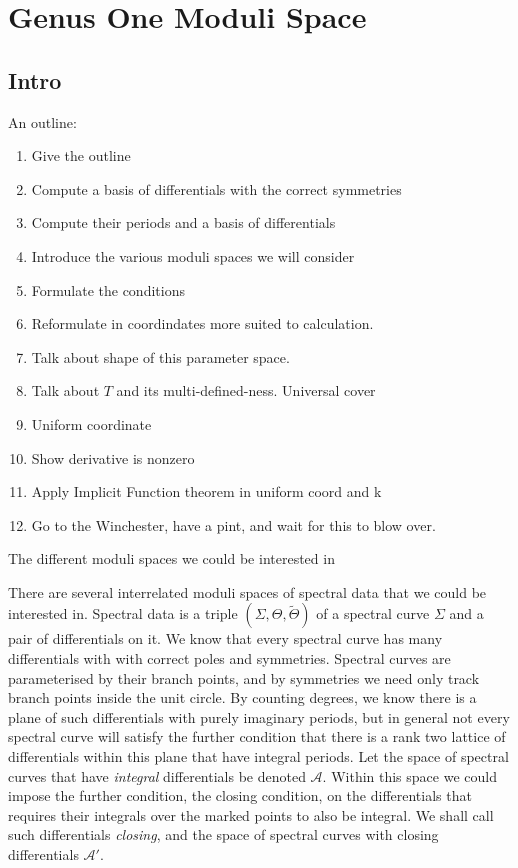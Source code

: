 
\section{Genus One Moduli Space}

\subsection{Intro}
\label{sub:Intro}

An outline:
\begin{enumerate}
\item
Give the outline
\item
Compute a basis of differentials with the correct symmetries
\item
Compute their periods and a basis of differentials
\item
Introduce the various moduli spaces we will consider
\item
Formulate the conditions
\item
Reformulate in coordindates more suited to calculation.
\item
Talk about shape of this parameter space.
\item
Talk about $T$ and its multi-defined-ness. Universal cover
\item
Uniform coordinate
\item
Show derivative is nonzero
\item
Apply Implicit Function theorem in uniform coord and k
\item
Go to the Winchester, have a pint, and wait for this to blow over.
\end{enumerate}

The different moduli spaces we could be interested in

There are several interrelated moduli spaces of spectral data that we could be interested in. Spectral data is a triple $(Σ,Θ,\tilde{Θ})$ of a spectral curve $Σ$ and a pair of differentials on it. We know that every spectral curve has many differentials with with correct poles and symmetries. Spectral curves are parameterised by their branch points, and by symmetries we need only track branch points inside the unit circle. By counting degrees, we know there is a plane of such differentials with purely imaginary periods, but in general not every spectral curve will satisfy the further condition that there is a rank two lattice of differentials within this plane that have integral periods. Let the space of spectral curves that have \emph{integral} differentials be denoted $\mathcal{A}$. Within this space we could impose the further condition, the closing condition, on the differentials that requires their integrals over the marked points to also be integral. We shall call such differentials \emph{closing}, and the space of spectral curves with closing differentials $\mathcal{A}'$.

